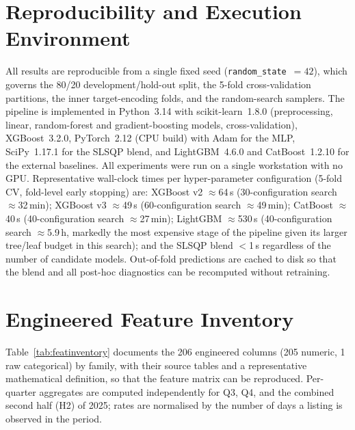 \documentclass[journal]{IEEEtran}
\begin{document}



\appendices
\section{Reproducibility and Execution Environment}
\label{app:env}
All results are reproducible from a single fixed seed
(\texttt{random\_state}~$=42$), which governs the 80/20 development/hold-out
split, the 5-fold cross-validation partitions, the inner target-encoding folds,
and the random-search samplers. The pipeline is implemented in Python~3.14
with scikit-learn~1.8.0 (preprocessing, linear, random-forest and
gradient-boosting models, cross-validation), XGBoost~3.2.0, PyTorch~2.12 (CPU
build) with Adam for the MLP, SciPy~1.17.1 for the SLSQP blend, and
LightGBM~4.6.0 and CatBoost~1.2.10 for the external baselines. All experiments
were run on a single workstation with no GPU. Representative wall-clock times
per hyper-parameter configuration (5-fold CV, fold-level early stopping) are:
XGBoost v2 $\approx$64\,s (30-configuration search $\approx$32\,min); XGBoost
v3 $\approx$49\,s (60-configuration search $\approx$49\,min); CatBoost
$\approx$40\,s (40-configuration search $\approx$27\,min); LightGBM
$\approx$530\,s (40-configuration search $\approx$5.9\,h, markedly the most
expensive stage of the pipeline given its larger tree/leaf budget in this
search); and the SLSQP blend $<$1\,s regardless of the number of candidate
models. Out-of-fold predictions are cached to disk so that the blend and all
post-hoc diagnostics can be recomputed without retraining.

\section{Engineered Feature Inventory}
\label{app:features}
Table~\ref{tab:featinventory} documents the 206 engineered columns (205
numeric, 1 raw categorical) by family, with their source tables and a
representative mathematical definition, so that the feature matrix can be
reproduced. Per-quarter aggregates are computed independently for Q3, Q4, and
the combined second half (H2) of 2025; rates are normalised by the number of
days a listing is observed in the period.
\end{document}
